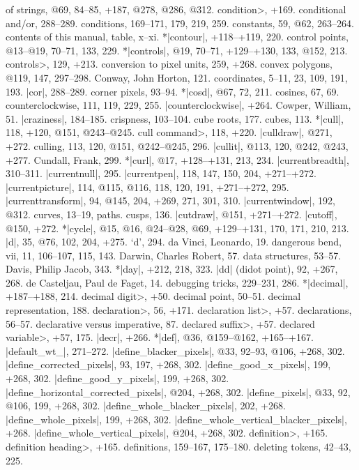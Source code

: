 \sub of strings, @69, 84--85, +187, @278, @286, @312.
\<condition>, +169.
conditional and/or, 288--289.
conditions, 169--171, 179, 219, 259.
constants, 59, @62, 263--264.
contents of this manual, table, x--xi.
*|contour|, +118--+119, 220.
control points, @13--@19, 70--71, 133, 229.
*|controls|, @19, 70--71, +129--+130, 133, @152, 213.
\<controls>, 129, +213.
conversion to pixel units, 259, +268.
convex polygons, @119, 147, 297--298.
Conway, John Horton, 121.
coordinates, 5--11, 23, 109, 191, 193.
|cor|, 288--289.
corner pixels, 93--94.
*|cosd|, @67, 72, 211.
cosines, 67, 69.
counterclockwise, 111, 119, 229, 255.
|counterclockwise|, +264.
Cowper, William, 51.
|craziness|, 184--185.
crispness, 103--104.
cube roots, 177.
cubes, 113.
*|cull|, 118, +120, @151, @243--@245.
\<cull command>, 118, +220.
|culldraw|, @271, +272.
culling, 113, 120, @151, @242--@245, 296.
|cullit|, @113, 120, @242, @243, +277.
Cundall, Frank, 299.
*|curl|, @17, +128--+131, 213, 234.
|currentbreadth|, 310--311.
|currentnull|, 295.
|currentpen|, 118, 147, 150, 204, +271--+272.
|currentpicture|, 114, @115, @116, 118, 120, 191, +271--+272, 295.
|currenttransform|, 94, @145, 204, +269, 271, 301, 310.
|currentwindow|, 192, @312.
curves, 13--19, \see paths.
cusps, 136.
|cutdraw|, @151, +271--+272.
|cutoff|, @150, +272.
*|cycle|, @15, @16, @24--@28, @69, +129--+131, 170, 171, 210, 213.
\newletter
|d|, 35, @76, 102, 204, +275.
`d', 294.
da Vinci, Leonardo, 19.
dangerous bend, vii, 11, 106--107, 115, 143.
Darwin, Charles Robert, 57.
data structures, 53--57.
Davis, Philip Jacob, 343.
*|day|, +212, 218, 323.
|dd| (didot point), 92, +267, 268.
de Casteljau, Paul de Faget, 14.
debugging tricks, 229--231, 286.
*|decimal|, +187--+188, 214.
\<decimal digit>, +50.
decimal point, 50--51.
decimal representation, 188.
\<declaration>, 56, +171.
\<declaration list>, +57.
declarations, 56--57.
declarative versus imperative, 87.
\<declared suffix>, +57.
\<declared variable>, +57, 175.
|decr|, +266.
*|def|, @36, @159--@162, +165--+167.
|default_wt_|, 271--272.
|define_blacker_pixels|, @33, 92--93, @106, +268, 302.
|define_corrected_pixels|, 93, 197, +268, 302.
|define_good_x_pixels|, 199, +268, 302.
|define_good_y_pixels|, 199, +268, 302.
|define_horizontal_corrected_pixels|, @204, +268, 302.
|define_pixels|, @33, 92, @106, 199, +268, 302.
|define_whole_blacker_pixels|, 202, +268.
|define_whole_pixels|, 199, +268, 302.
|define_whole_vertical_blacker_pixels|, +268.
|define_whole_vertical_pixels|, @204, +268, 302.
\<definition>, +165.
\<definition heading>, +165.
definitions, 159--167, 175--180.
deleting tokens, 42--43, 225.
